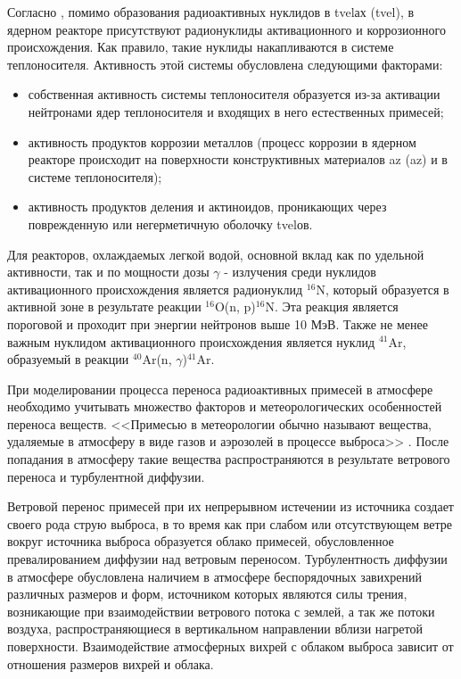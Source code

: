 Согласно \cite{gusev_bio, gusev_def, egorov}, помимо образования радиоактивных нуклидов в \ac{tvel}ах (\acl{tvel}), 
в ядерном реакторе присутствуют радионуклиды активационного и коррозионного происхождения. Как правило, такие нуклиды 
накапливаются в системе теплоносителя. Активность этой системы обусловлена следующими факторами:

\begin{itemize}
	\item собственная активность системы теплоносителя образуется из-за активации нейтронами ядер теплоносителя и 
		входящих в него естественных примесей;
	\item активность продуктов коррозии металлов (процесс коррозии в ядерном реакторе происходит на поверхности 
		конструктивных материалов \ac{az} (\acl{az}) и в системе теплоносителя);
	\item активность продуктов деления и актиноидов, проникающих через поврежденную или негерметичную оболочку 
		\ac{tvel}ов.
\end{itemize}
Для реакторов, охлаждаемых легкой водой, основной вклад как по удельной активности, так и по мощности дозы $\gamma$ - 
излучения среди нуклидов активационного происхождения является радионуклид $^{16}\text{N}$, который образуется в
активной зоне в результате реакции $^{16}\text{O}$(n, p)$^{16}\text{N}$. Эта реакция является 
пороговой и проходит при энергии нейтронов выше 10 МэВ. Также не менее важным нуклидом активационного происхождения 
является нуклид $^{41}\text{Ar}$, образуемый в реакции $^{40}\text{Ar}$(n, $\gamma$)$^{41}\text{Ar}$.

При моделировании процесса переноса радиоактивных примесей в атмосфере необходимо учитывать множество факторов и 
метеорологических особенностей переноса веществ. <<Примесью в метеорологии обычно называют вещества, удаляемые в 
атмосферу в виде газов и  аэрозолей в процессе выброса>> \cite[с. 52]{gusev_bio}. После попадания в атмосферу такие 
вещества распространяются в результате ветрового переноса и турбулентной диффузии. 

Ветровой перенос примесей при их непрерывном истечении из источника создает своего рода струю выброса, в то время как 
при слабом или отсутствующем ветре вокруг источника выброса образуется облако примесей, обусловленное превалированием 
диффузии над ветровым переносом. Турбулентность диффузии в атмосфере обусловлена наличием в атмосфере беспорядочных 
завихрений различных размеров и форм, источником которых являются силы трения, возникающие при взаимодействии ветрового 
потока с землей, а так же потоки воздуха, распространяющиеся в вертикальном направлении вблизи нагретой поверхности. 
Взаимодействие атмосферных вихрей с облаком выброса зависит от отношения размеров вихрей и облака. \cite{gusev_bio}

